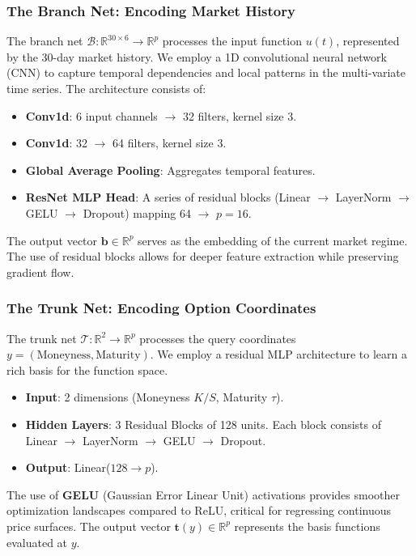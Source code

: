 \documentclass{article}
\newcommand{\bb}{\mathbb}
\begin{document}
\subsubsection{The Branch Net: Encoding Market History}
The branch net \(\mathcal{B}: \bb{R}^{30 \times 6} \to \bb{R}^p\) processes the input function \(u(t)\), represented by the 30-day market history. We employ a 1D convolutional neural network (CNN) to capture temporal dependencies and local patterns in the multi-variate time series. The architecture consists of:
\begin{itemize}
    \item \textbf{Conv1d}: 6 input channels \(\to\) 32 filters, kernel size 3.
    \item \textbf{Conv1d}: 32 \(\to\) 64 filters, kernel size 3.
    \item \textbf{Global Average Pooling}: Aggregates temporal features.
    \item \textbf{ResNet MLP Head}: A series of residual blocks (Linear \(\to\) LayerNorm \(\to\) GELU \(\to\) Dropout) mapping 64 \(\to\) \(p=16\).
\end{itemize}
The output vector \(\mathbf{b} \in \bb{R}^p\) serves as the embedding of the current market regime. The use of residual blocks allows for deeper feature extraction while preserving gradient flow.

\subsubsection{The Trunk Net: Encoding Option Coordinates}
The trunk net \(\mathcal{T}: \bb{R}^2 \to \bb{R}^p\) processes the query coordinates \(y = (\text{Moneyness}, \text{Maturity})\). We employ a residual MLP architecture to learn a rich basis for the function space.
\begin{itemize}
    \item \textbf{Input}: 2 dimensions (Moneyness \(K/S\), Maturity \(\tau\)).
    \item \textbf{Hidden Layers}: 3 Residual Blocks of 128 units. Each block consists of Linear \(\to\) LayerNorm \(\to\) GELU \(\to\) Dropout.
    \item \textbf{Output}: Linear(\(128 \to p\)).
\end{itemize}
The use of \textbf{GELU} (Gaussian Error Linear Unit) activations provides smoother optimization landscapes compared to ReLU, critical for regressing continuous price surfaces. The output vector \(\mathbf{t}(y) \in \bb{R}^p\) represents the basis functions evaluated at \(y\).
\end{document}
